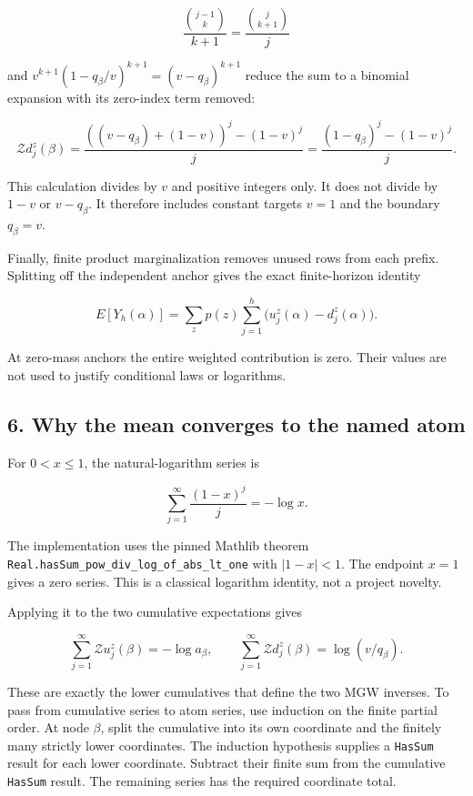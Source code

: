 \[
\frac{\binom{j-1}{k}}{k+1}=\frac{\binom{j}{k+1}}{j}
\]

and \(v^{k+1}(1-q_\beta/v)^{k+1}=(v-q_\beta)^{k+1}\) reduce the sum to a binomial expansion with its zero-index term removed:

\[
\mathcal Zd_j^z(\beta)
=\frac{((v-q_\beta)+(1-v))^j-(1-v)^j}{j}
=\frac{(1-q_\beta)^j-(1-v)^j}{j}.
\]

This calculation divides by \(v\) and positive integers only. It does not divide by \(1-v\) or \(v-q_\beta\). It therefore includes constant targets \(v=1\) and the boundary \(q_\beta=v\).

Finally, finite product marginalization removes unused rows from each prefix. Splitting off the independent anchor gives the exact finite-horizon identity

\[
E[Y_h(\alpha)]
=\sum_zp(z)\sum_{j=1}^h\bigl(u_j^z(\alpha)-d_j^z(\alpha)\bigr).
\]

At zero-mass anchors the entire weighted contribution is zero. Their values are not used to justify conditional laws or logarithms.

\subsection{6. Why the mean converges to the named atom}\label{why-the-mean-converges-to-the-named-atom}

For \(0<x\le1\), the natural-logarithm series is

\[
\sum_{j=1}^{\infty}\frac{(1-x)^j}{j}=-\log x.
\]

The implementation uses the pinned Mathlib theorem \texttt{Real.hasSum\_pow\_div\_log\_of\_abs\_lt\_one} with \(|1-x|<1\). The endpoint \(x=1\) gives a zero series. This is a classical logarithm identity, not a project novelty.

Applying it to the two cumulative expectations gives

\[
\sum_{j=1}^{\infty}\mathcal Zu_j^z(\beta)=-\log a_\beta,
\qquad
\sum_{j=1}^{\infty}\mathcal Zd_j^z(\beta)=\log(v/q_\beta).
\]

These are exactly the lower cumulatives that define the two MGW inverses. To pass from cumulative series to atom series, use induction on the finite partial order. At node \(\beta\), split the cumulative into its own coordinate and the finitely many strictly lower coordinates. The induction hypothesis supplies a \texttt{HasSum} result for each lower coordinate. Subtract their finite sum from the cumulative \texttt{HasSum} result. The remaining series has the required coordinate total.

